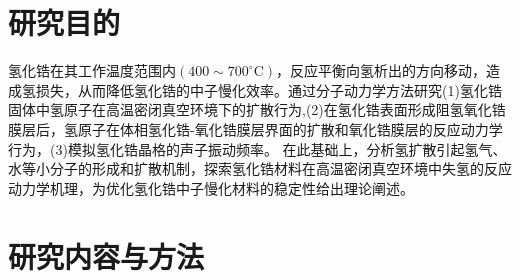 \section{研究目的} 
氢化锆在其工作温度范围内$(400\sim700^{\circ}\mathrm{C})$，反应平衡向氢析出的方向移动，造成氢损失，从而降低氢化锆的中子慢化效率。通过分子动力学方法研究(1)氢化锆固体中氢原子在高温密闭真空环境下的扩散行为,(2)在氢化锆表面形成阻氢氧化锆膜层后，氢原子在体相氢化锆-氧化锆膜层界面的扩散和氧化锆膜层的反应动力学行为，(3)模拟氢化锆晶格的声子振动频率。%
在此基础上，分析氢扩散引起氢气、水等小分子的形成和扩散机制，探索氢化锆材料在高温密闭真空环境中失氢的反应动力学机理，为优化氢化锆中子慢化材料的稳定性给出理论阐述。

\section{研究内容与方法}
